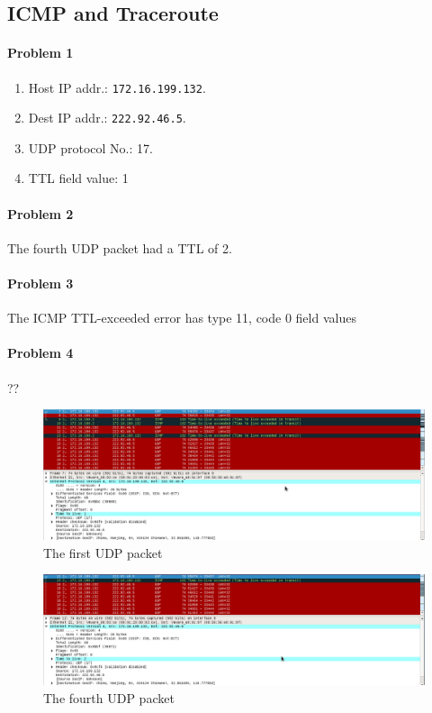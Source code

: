 \documentclass[12pt]{article}
\begin{document}
\subsection{ICMP and Traceroute}
\paragraph{Problem 1}
\begin{enumerate}[label=\textbf{Part \alph*)}, leftmargin=*, align=left]
	\item Host IP addr.: \texttt{172.16.199.132}.
	\item Dest IP addr.: \texttt{222.92.46.5}.
	\item UDP protocol No.: 17.
	\item TTL field value: 1
\end{enumerate}
\paragraph{Problem 2}
The fourth UDP packet had a TTL of 2.
\paragraph{Problem 3}
The ICMP TTL-exceeded error has type 11, code 0 field values

\paragraph{Problem 4}
??

\begin{figure}[H]
	\caption{The first UDP packet}
	\centering
	\includegraphics[width=\textwidth,height=\textheight,keepaspectratio,scale=0.5=0.5]{firstUDP}
\end{figure}

\begin{figure}[H]
	\caption{The fourth UDP packet}
	\centering
	\includegraphics[width=\textwidth,height=\textheight,keepaspectratio,scale=0.5=0.5]{4thUDP}
\end{figure}
\end{document}
